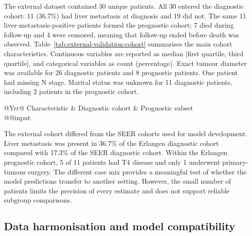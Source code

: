 The external dataset contained 30 unique patients. All 30 entered the diagnostic
cohort: 11 (36.7\%) had liver metastasis at diagnosis and 19 did not. The same 11
liver-metastasis-positive patients formed the prognostic cohort; 7 died during
follow-up and 4 were censored, meaning that follow-up ended before death was
observed. Table~\ref{tab:external-validation:cohort} summarises the main cohort
characteristics. Continuous variables are reported as median [first quartile,
third quartile], and categorical variables as count (percentage). Exact tumour
diameter was available for 26 diagnostic patients and 8 prognostic patients. One
patient had missing N stage. Marital status was unknown for 11 diagnostic
patients, including 2 patients in the prognostic cohort.

\begin{table}[htbp]
\centering\small
\caption{Characteristics of the University Hospital Erlangen external cohort.
The prognostic cohort is the liver-metastasis-positive subset of the diagnostic
cohort. Percentages use the full cohort size as the denominator; consequently,
the N1 percentages include the patient with missing N stage in the denominator.
Tumour-size summaries include only patients with an exact measurement in
millimetres.}
\label{tab:external-validation:cohort}
\begin{tabularx}{\linewidth}{@{}Yrr@{}}
\toprule
Characteristic & Diagnostic cohort & Prognostic subset \\
\midrule
\csname @@input
\bottomrule
\end{tabularx}
\end{table}

The external cohort differed from the SEER cohorts used for model development.
Liver metastasis was present in 36.7\% of the Erlangen diagnostic cohort compared
with 17.3\% of the SEER diagnostic cohort. Within the Erlangen prognostic cohort,
5 of 11 patients had T4 disease and only 1 underwent primary-tumour surgery. The
different case mix provides a meaningful test of whether the model predictions
transfer to another setting. However, the small number of patients limits the
precision of every estimate and does not support reliable subgroup comparisons.

\subsection{Data harmonisation and model compatibility}
\label{sec:external-validation:mapping}

